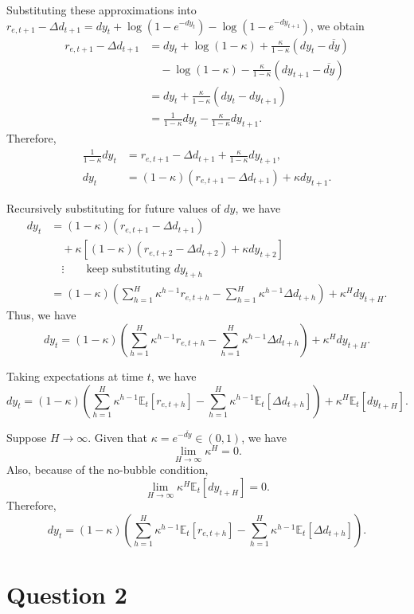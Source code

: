 \documentclass[11pt]{article}
\begin{document}
Substituting these approximations into
$r_{e,t+1}-\Delta d_{t+1}
=dy_t+\log(1-e^{-dy_t})-\log(1-e^{-dy_{t+1}})$, we obtain
\begin{align*}
r_{e,t+1}-\Delta d_{t+1}
&=dy_t+\log(1-\kappa)
+\frac{\kappa}{1-\kappa}(dy_t-\overline{dy}) \\
&\quad-\log(1-\kappa)
-\frac{\kappa}{1-\kappa}(dy_{t+1}-\overline{dy}) \\
&=dy_t+\frac{\kappa}{1-\kappa}(dy_t-dy_{t+1}) \\
&=\frac{1}{1-\kappa}dy_t
-\frac{\kappa}{1-\kappa}dy_{t+1}.
\end{align*}
Therefore,
\begin{align*}
\frac{1}{1-\kappa}dy_t
&=r_{e,t+1}-\Delta d_{t+1}
+\frac{\kappa}{1-\kappa}dy_{t+1}, \\
dy_t
&=(1-\kappa)(r_{e,t+1}-\Delta d_{t+1})
+\kappa dy_{t+1}.
\end{align*}

Recursively substituting for future values of $dy$, we have
\begin{align*}
dy_t
&=(1-\kappa)(r_{e,t+1}-\Delta d_{t+1}) \\
&\quad+\kappa\left[(1-\kappa)(r_{e,t+2}-\Delta d_{t+2})
+\kappa dy_{t+2}\right] \\
&\quad\vdots \qquad \text{keep substituting }dy_{t+h} \\
&=(1-\kappa)\left(
\sum_{h=1}^{H}\kappa^{h-1}r_{e,t+h}
-\sum_{h=1}^{H}\kappa^{h-1}\Delta d_{t+h}
\right)+\kappa^Hdy_{t+H}.
\end{align*}
Thus, we have
\[
dy_t=(1-\kappa)\left(
\sum_{h=1}^{H}\kappa^{h-1}r_{e,t+h}
-\sum_{h=1}^{H}\kappa^{h-1}\Delta d_{t+h}
\right)+\kappa^Hdy_{t+H}.
\]

Taking expectations at time $t$, we have
\[
dy_t=(1-\kappa)\left(
\sum_{h=1}^{H}\kappa^{h-1}\mathbb{E}_t[r_{e,t+h}]
-\sum_{h=1}^{H}\kappa^{h-1}\mathbb{E}_t[\Delta d_{t+h}]
\right)+\kappa^H\mathbb{E}_t[dy_{t+H}].
\]

Suppose $H\to\infty$. Given that
$\kappa=e^{-\overline{dy}}\in(0,1)$, we have
\[
\lim_{H\to\infty}\kappa^H=0.
\]
Also, because of the no-bubble condition,
\[
\lim_{H\to\infty}\kappa^H\mathbb{E}_t[dy_{t+H}]=0.
\]
Therefore,
\[
dy_t=(1-\kappa)\left(
\sum_{h=1}^{H}\kappa^{h-1}\mathbb{E}_t[r_{e,t+h}]
-\sum_{h=1}^{H}\kappa^{h-1}\mathbb{E}_t[\Delta d_{t+h}]
\right).
\]

\section{Question 2}
\end{document}
